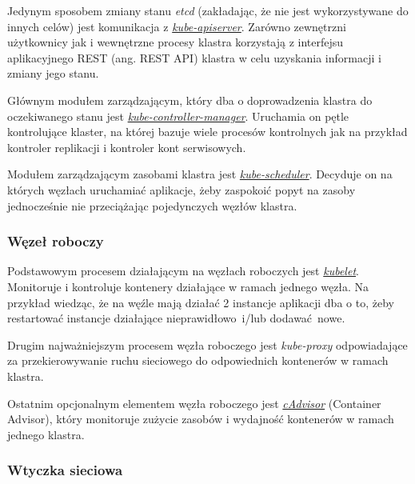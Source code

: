 \documentclass[a4paper,12pt,twoside,openany]{report}
\begin{document}
Jedynym sposobem zmiany stanu \emph{etcd} (zakładając, że nie jest
wykorzystywane do innych celów) jest komunikacja z
\href{https://kubernetes.io/docs/reference/generated/kube-apiserver/}{\emph{kube-apiserver}}.
Zarówno zewnętrzni użytkownicy jak i wewnętrzne procesy klastra
korzystają z interfejsu aplikacyjnego REST (ang. REST API) klastra w
celu uzyskania informacji i zmiany jego stanu.

Głównym modułem zarządzającym, który dba o doprowadzenia klastra do
oczekiwanego stanu jest
\href{https://kubernetes.io/docs/reference/generated/kube-controller-manager/}{\emph{kube-controller-manager}}.
Uruchamia on pętle kontrolujące klaster, na której bazuje wiele procesów
kontrolnych jak na przykład kontroler replikacji i kontroler kont
serwisowych.

Modułem zarządzającym zasobami klastra jest
\href{https://kubernetes.io/docs/reference/generated/kube-scheduler/}{\emph{kube-scheduler}}.
Decyduje on na których węzłach uruchamiać aplikacje, żeby zaspokoić
popyt na zasoby jednocześnie nie przeciążając pojedynczych węzłów
klastra.

\hypertarget{wux119zeux142-roboczy}{%
\subsubsection{Węzeł roboczy}\label{wux119zeux142-roboczy}}

Podstawowym procesem działającym na węzłach roboczych jest
\href{https://kubernetes.io/docs/reference/generated/kubelet/}{\emph{kubelet}}.
Monitoruje i kontroluje kontenery działające w ramach jednego węzła. Na
przykład wiedząc, że na węźle mają działać 2 instancje aplikacji dba o
to, żeby restartować instancje działające nieprawidłowo~i/lub
dodawać~nowe.

Drugim najważniejszym procesem węzła roboczego jest \emph{kube-proxy}
odpowiadające za przekierowywanie ruchu sieciowego do odpowiednich
kontenerów w ramach klastra.

Ostatnim opcjonalnym elementem węzła roboczego jest
\href{https://github.com/google/cadvisor}{\emph{cAdvisor}} (Container
Advisor), który monitoruje zużycie zasobów i wydajność kontenerów w
ramach jednego klastra.

\hypertarget{wtyczka-sieciowa}{%
\subsubsection{Wtyczka sieciowa}\label{wtyczka-sieciowa}}
\end{document}
